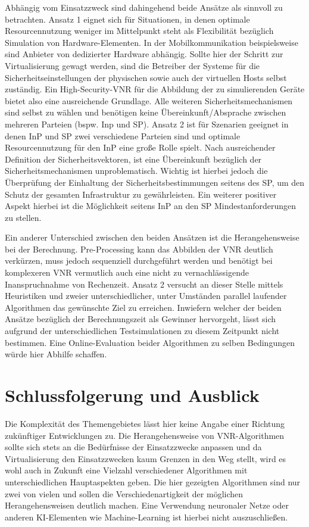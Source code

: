 \documentclass{lni}
\begin{document}
Abhängig vom Einsatzzweck sind dahingehend beide Ansätze als sinnvoll zu betrachten. Ansatz 1 eignet sich für Situationen, in denen optimale Resourcennutzung weniger im Mittelpunkt steht als Flexibilität bezüglich Simulation von Hardware-Elementen. In der Mobilkommunikation beispielsweise sind Anbieter von dedizierter Hardware abhängig. Sollte hier der Schritt zur Virtualisierung gewagt werden, sind die Betreiber der Systeme für die Sicherheitseinstellungen der physischen sowie auch der virtuellen Hosts selbst zuständig. Ein High-Security-VNR für die Abbildung der zu simulierenden Geräte bietet also eine ausreichende Grundlage. Alle weiteren Sicherheitsmechanismen sind selbst zu wählen und benötigen keine Übereinkunft/Absprache zwischen mehreren Parteien (bspw. Inp und SP). Ansatz 2 ist für Szenarien geeignet in denen InP und SP zwei verschiedene Parteien sind und optimale Resourcennutzung für den InP eine große Rolle spielt. Nach ausreichender Definition der Sicherheitsvektoren, ist eine Übereinkunft bezüglich der Sicherheitsmechanismen unproblematisch. Wichtig ist hierbei jedoch die Überprüfung der Einhaltung der Sicherheitsbestimmungen seitens des SP, um den Schutz der gesamten Infrastruktur zu gewährleisten. Ein weiterer positiver Aspekt hierbei ist die Möglichkeit seitens InP an den SP Mindestanforderungen zu stellen.

Ein anderer Unterschied zwischen den beiden Ansätzen ist die Herangehensweise bei der Berechnung. Pre-Processing kann das Abbilden der VNR deutlich verkürzen, muss jedoch sequenziell durchgeführt werden und benötigt bei komplexeren VNR vermutlich auch eine nicht zu vernachlässigende Inanspruchnahme von Rechenzeit. Ansatz 2 versucht an dieser Stelle mittels Heuristiken und zweier unterschiedlicher, unter Umständen parallel laufender Algorithmen das gewünschte Ziel zu erreichen. Inwiefern welcher der beiden Ansätze bezüglich der Berechnungszeit als Gewinner hervorgeht, lässt sich aufgrund der unterschiedlichen Testsimulationen zu diesem Zeitpunkt nicht bestimmen. Eine Online-Evaluation beider Algorithmen zu selben Bedingungen würde hier Abhilfe schaffen.


\section{Schlussfolgerung und Ausblick}
\label{sec:schluss}

Die Komplexität des Themengebietes lässt hier keine Angabe einer Richtung zukünftiger Entwicklungen zu. Die Herangehensweise von VNR-Algorithmen sollte sich stets an die Bedürfnisse der Einsatzzwecke anpassen und da Virtualisierung den Einsatzzwecken kaum Grenzen in den Weg stellt, wird es wohl auch in Zukunft eine Vielzahl verschiedener Algorithmen mit unterschiedlichen Hauptaspekten geben. Die hier gezeigten Algorithmen sind nur zwei von vielen und sollen die Verschiedenartigkeit der möglichen Herangehensweisen deutlich machen. Eine Verwendung neuronaler Netze oder anderen KI-Elementen wie Machine-Learning ist hierbei nicht auszuschließen.
\end{document}
